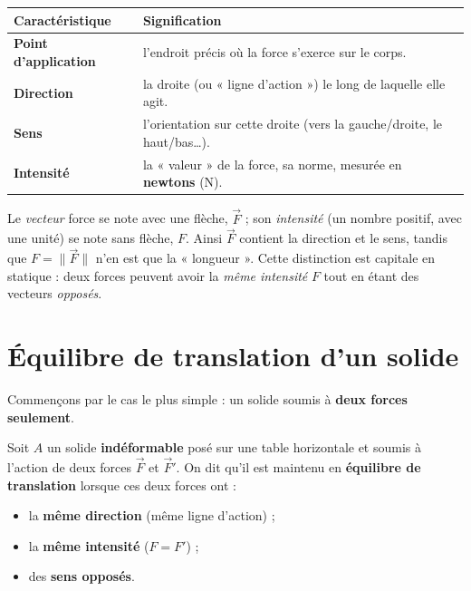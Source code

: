 \documentclass[11pt,a4paper]{article}
\newcommand{\vv}[1]{\vec{#1}}
\begin{document}
\begin{center}
\renewcommand{\arraystretch}{1.3}
\begin{tabular}{>{\bfseries}p{3.3cm} p{10.2cm}}
\rowcolor{primary!12}
Caractéristique & Signification \\
\hline
Point d'application & l'endroit précis où la force s'exerce sur le corps. \\
Direction & la droite (ou « ligne d'action ») le long de laquelle elle agit. \\
Sens & l'orientation sur cette droite (vers la gauche/droite, le haut/bas\dots). \\
Intensité & la « valeur » de la force, sa norme, mesurée en \textbf{newtons} (\si{\newton}). \\
\end{tabular}
\end{center}

\begin{remarque}[notation]
Le \emph{vecteur} force se note avec une flèche, $\vv F$ ; son \emph{intensité} (un nombre positif,
avec une unité) se note sans flèche, $F$. Ainsi $\vv F$ contient la direction et le sens, tandis
que $F = \lVert \vv F\rVert$ n'en est que la « longueur ». Cette distinction est capitale en statique :
deux forces peuvent avoir la \emph{même intensité} $F$ tout en étant des vecteurs \emph{opposés}.
\end{remarque}

\section{Équilibre de translation d'un solide}
Commençons par le cas le plus simple : un solide soumis à \textbf{deux forces seulement}.

\begin{definition}
Soit $A$ un solide \textbf{indéformable} posé sur une table horizontale et soumis à l'action de
deux forces $\vv F$ et $\vv F'$. On dit qu'il est maintenu en \textbf{équilibre de translation}
lorsque ces deux forces ont :
\begin{itemize}[leftmargin=1.6em,topsep=2pt,itemsep=1pt]
  \item la \textbf{même direction} (même ligne d'action) ;
  \item la \textbf{même intensité} ($F = F'$) ;
  \item des \textbf{sens opposés}.
\end{itemize}
\end{definition}
\end{document}
